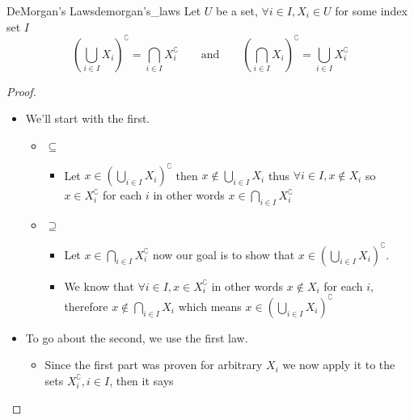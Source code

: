 \begin{theorem}{DeMorgan's Laws}{demorgan's_laws}
Let $U$ be a set, $ \forall i \in  I, X_{ i } \in  U $ for some index set $ I $ 
\[
    \left( \bigcup_{ i \in  I }  X_{i} \right) ^{\complement}  = \bigcap _{ i
    \in  I } X_{i}^{\complement} \qquad \text{and} \qquad \left( \bigcap _{ i
    \in  I }  X_{i}  \right)^{\complement} = \bigcup _{ i \in I }  X_{i}
    ^{\complement}
\]
\end{theorem}
\begin{proof}
    \begin{itemize}
        \item We'll start with the first.
        \begin{itemize}
            \item $ \subseteq$ 
            \begin{itemize}
                \item Let $x \in  \left( \bigcup _{ i \in I }  X_{i}
                \right)^{\complement} $ then $x \not\in \bigcup _{ i \in  I }
                X_{i}$ thus $\forall i \in  I, x \not\in X_{i}$ so $x \in X_{i}
                ^ {\complement}$ for each $i$ in other words $x \in \bigcap _{ i
                \in  I }  X_{i} ^ {\complement}$
            \end{itemize}
            \item $ \supseteq$ 
                \begin{itemize}
                    \item Let $x \in \bigcap _{ i \in I }  X_{i} ^
                    {\complement}$ now our goal is to show that $x  \in\left(
                    \bigcup _{ i \in I }  X_{i} \right)^{\complement}$.
                \item We know that $\forall i \in I, x \in X_{i}^{\complement}$
                in other words $x \not\in X_{i}$ for each $i$, therefore $x
                \not\in \bigcap _{ i \in  I }  X_{i}$ which means $x \in \left(
                \bigcup _{ i \in  I }  X_{i} \right)^{\complement}$
                \end{itemize}
        \end{itemize}
        \item To go about the second, we use the first law. 
        \begin{itemize}
            \item Since the first part was proven for arbitrary $X_{i}$ we now
            apply it to the sets $X_{i}^{\complement}, i \in  I$, then it says
                \[
\]
\end{itemize}
\end{itemize}
\end{proof}
